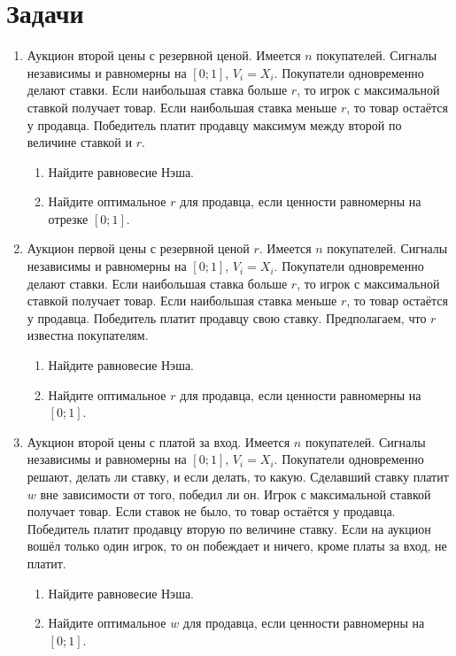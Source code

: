 \section{Задачи}
\begin{enumerate}
\item Аукцион второй цены с резервной ценой. Имеется $n$ покупателей.  Сигналы независимы и равномерны на $ [0;1] $, $ V_{i}=X_{i} $. Покупатели одновременно делают ставки. Если наибольшая ставка больше $ r $, то игрок с максимальной ставкой получает товар. Если наибольшая ставка меньше $ r $, то товар остаётся у продавца. Победитель платит продавцу максимум между второй по величине ставкой и $r$.
\begin{enumerate}
\item Найдите равновесие Нэша.
\item Найдите оптимальное $ r $ для продавца, если ценности равномерны на отрезке $ [0;1] $.
\end{enumerate}


\item Аукцион первой цены с резервной ценой $ r $. Имеется $ n $ покупателей.  Сигналы независимы и равномерны на $ [0;1] $, $ V_{i}=X_{i} $. Покупатели одновременно делают ставки. Если наибольшая ставка больше $ r $, то игрок с максимальной ставкой получает товар. Если наибольшая ставка меньше $ r $, то товар остаётся у продавца. Победитель платит продавцу свою ставку. Предполагаем, что $ r $ известна покупателям.
\begin{enumerate}
\item Найдите равновесие Нэша.
\item Найдите оптимальное $ r $ для продавца, если ценности равномерны на $ [0;1] $.
\end{enumerate}


\item Аукцион второй цены с платой за вход. Имеется $ n $ покупателей.  Сигналы независимы и равномерны на $ [0;1] $, $ V_{i}=X_{i} $. Покупатели одновременно решают, делать ли ставку, и если делать, то какую. Сделавший ставку платит $ w $ вне зависимости от того, победил ли он. Игрок с максимальной ставкой получает товар. Если ставок не было, то товар остаётся у продавца. Победитель платит продавцу вторую по величине ставку. Если на аукцион вошёл только один игрок, то он побеждает и  ничего, кроме платы за вход, не платит.
\begin{enumerate}
\item Найдите равновесие Нэша.
\item Найдите оптимальное $ w $ для продавца, если ценности равномерны на $ [0;1] $.
\end{enumerate}



\end{enumerate}
